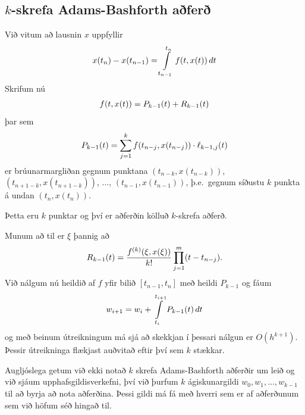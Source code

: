 \documentclass[letterpaper,10pt,icelandic]{sphinxmanual}
\begin{document}

\subsection{\(k\)-skrefa Adams-Bashforth aðferð}
\label{kafli06:index-17}\label{kafli06:skrefa-adams-bashforth-afer}
Við vitum að lausnin \(x\) uppfyllir
\begin{gather}
\begin{split}x(t_{n}) - x(t_{n-1}) =
  \int\limits_{t_{n-1}}^{t_n} f(t,x(t)) \, dt\end{split}\notag
\end{gather}
Skrifum nú
\begin{gather}
\begin{split}f(t,x(t)) = P_{k-1}(t) + R_{k-1}(t)\end{split}\notag
\end{gather}
þar sem
\begin{gather}
\begin{split}P_{k-1}(t) = \sum\limits_{j=1}^k f(t_{n-j},x(t_{n-j})) \cdot
  \ell_{k-1,j}(t)\end{split}\notag
\end{gather}
er brúunarmargliðan gegnum punktana \((t_{n-k},x(t_{n-k}))\),
\((t_{n+1-k},x(t_{n+1-k}))\), \(\ldots\),
\((t_{n-1},x(t_{n-1}))\), þ.e. gegnum síðustu \(k\) punkta á
undan \((t_n,x(t_n))\).

Þetta eru \(k\) punktar og því er aðferðin kölluð \(k\)-skrefa
aðferð.

Munum að til er \(\xi\) þannig að
\begin{gather}
\begin{split}R_{k-1}(t) = \frac{f^{(k)}(\xi,x(\xi))}{k!}
  \prod\limits_{j=1}^m (t-t_{n-j}).\end{split}\notag
\end{gather}
Við nálgum nú heildið af \(f\) yfir bilið \([t_{n-1},t_n]\) með
heildi \(P_{k-1}\) og fáum
\begin{gather}
\begin{split}w_{i+1} = w_i +
  \int\limits_{t_i}^{t_{i+1}} P_{k-1}(t) \, dt\end{split}\notag
\end{gather}
og með beinum útreikningum má sjá að skekkjan í þessari nálgun er
\(O(h^{k+1})\). Þessir útreikninga flækjast auðvitað eftir því sem
\(k\) stækkar.

Augljóslega getum við ekki notað \(k\) skrefa Adams-Bashforth
aðferðir um leið og við sjáum upphafsgildisverkefni, því við þurfum
\(k\) ágiskunargildi \(w_0, w_1, \ldots, w_{k-1}\) til að byrja
að nota aðferðina. Þessi gildi má fá með hverri sem er af aðferðunum sem
við höfum séð hingað til.
\end{document}
